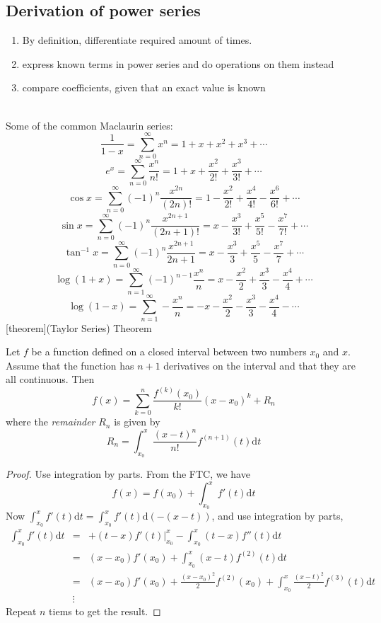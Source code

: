 \documentclass[12pt]{report}
\theoremstyle{definition}
\begin{document}
\subsection{Derivation of power series}
\begin{enumerate}
    \item By definition, differentiate required amount of times.
    \item express known terms in power series and do operations on them instead
    \item compare coefficients, given that an exact value is known
\end{enumerate}
\\Some of the common Maclaurin series:\[
    \frac{1}{1-x} = \sum_{n=0}^{\infty} x^{n} = 1 + x + x^{2} + x^{3} + \cdots 
\]\[
    e^{x} = \sum_{n=0}^{\infty} \frac{x^{n}}{n!} = 1 + x + \frac{x^{2}}{2!} + \frac{x^{3}}{3!} + \cdots
\]\[
\cos{x} = \sum_{n=0}^{\infty} {(-1)}^{n} \frac{x^{2n}}{(2n)!}
= 1 - \frac{x^{2}}{2!} + \frac{x^{4}}{4!} - \frac{x^{6}}{6!} + \cdots
\]\[
\sin{x} = \sum_{n=0}^{\infty} {(-1)}^{n}\frac{x^{2n+1}}{(2n+1)!}
= x - \frac{x^{3}}{3!} + \frac{x^{5}}{5!} - \frac{x^{7}}{7!} + \cdots
\]\[
\tan^{-1}{x} = \sum_{n=0}^{\infty} {(-1)}^{n} \frac{x^{2n+1}}{2n+1}
= x - \frac{x^{3}}{3} + \frac{x^{5}}{5} - \frac{x^{7}}{7} + \cdots
\]\[
\log{(1+x)} = \sum_{n=1}^{\infty} {(-1)}^{n-1} \frac{x^{n}}{n} 
= x - \frac{x^{2}}{2} + \frac{x^{3}}{3} - \frac{x^{4}}{4} + \cdots
\]\[
\log{(1-x)} = \sum_{n=1}^{\infty} -\frac{x^{n}}{n}
= - x - \frac{x^{2}}{2} - \frac{x^{3}}{3} - \frac{x^{4}}{4} - \cdots
\]
[theorem]{(Taylor Series) Theorem}
\begin{Taylor's theorem}
    Let $f$ be a function defined on a closed interval between two numbers $x_0$ and $x$.
    Assume that the function has $n+1$ derivatives on the interval and that they are all continuous. Then \[
        f(x) = \sum_{k=0}^{n} \frac{f^{(k)}(x_0)}{k!} {(x-x_0)}^{k} + R_n
    \]where the \emph{remainder} $R_n$ is given by\[
    R_n = \int_{x_0}^{x} \frac{{(x-t)}^{n}}{n!} f^{(n+1)}(t) \mathrm{d}t
    \]
\end{Taylor's theorem}
\begin{proof}
    Use integration by parts. From the FTC, we have \[
        f(x) = f(x_0) + \int_{x_0}^{x} f'(t)\mathrm{d}t 
    \]Now $\int_{x_0}^{x} f'(t)\mathrm{d}t = \int_{x_0}^{x} f'(t)\mathrm{d}(-(x-t))$, and use integration by parts,
    \begin{eqnarray*}
        \int_{x_0}^{x} f'(t)\mathrm{d}t
        &=& +(t-x)f'(t)\big|^x_{x_0} - \int_{x_0}^{x} (t-x)f''(t)\mathrm{d}t \\
        &=& (x-x_0)f'(x_0) + \int_{x_0}^{x} (x-t)f^{(2)}(t)\mathrm{d}t \\
        &=& (x-x_0)f'(x_0) + \frac{{(x-x_0)}^{2}}{2}f^{(2)}(x_0) 
        + \int_{x_0}^{x} \frac{{(x-t)}^{2}}{2}f^{(3)}(t)\mathrm{d}t \\
        &\vdots&
    \end{eqnarray*}
    Repeat $n$ tiems to get the result.
\end{proof}
\end{document}
